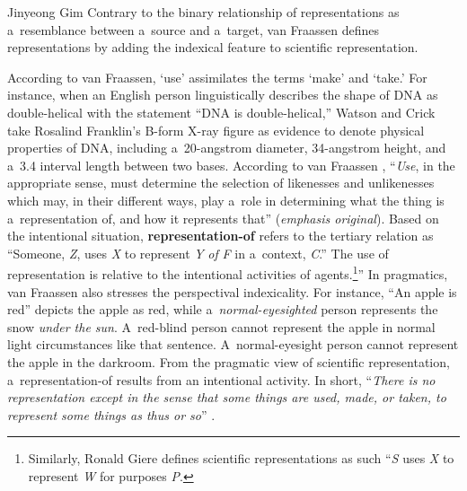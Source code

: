 \begin{artengenv}{Jinyeong Gim}
Contrary to the binary relationship of representations as a~resemblance between a~source and a~target, van Fraassen defines representations by adding the indexical feature to scientific representation.

According to van Fraassen, ‘use' assimilates the terms ‘make' and ‘take.' For instance, when an English person linguistically describes the shape of DNA as double-helical with the statement ``DNA is double-helical,'' Watson and Crick take Rosalind Franklin's B-form X-ray figure as evidence to denote physical properties of DNA, including a~20-angstrom diameter, 34-angstrom height, and a~3.4 interval length between two bases. According to van Fraassen
\parencite*[][p.23]{van_fraassen_scientific_2008}, %
 ``\textit{Use}, in the appropriate sense, must determine the selection of likenesses and unlikenesses which may, in their different ways, play a~role in determining what the thing is a~representation of, and how it represents that'' (\textit{emphasis original}). Based on the intentional situation, \textbf{representation-of} refers to the tertiary relation as ``Someone, \textit{Z}, uses \textit{X} to represent \textit{Y} \textit{of} \textit{F} in a~context, \textit{C}.'' The use of representation is relative to the intentional activities of agents.\footnote{Similarly, Ronald Giere 
\parencite*[][p.60]{giere_scientific_2006} %
 defines scientific representations as such ``\textit{S} uses \textit{X} to represent \textit{W} for purposes \textit{P}.}'' In pragmatics, van Fraassen also stresses the perspectival indexicality. For instance, ``An apple is red'' depicts the apple as red, while a~\textit{normal-eyesighted} person represents the snow \textit{under the sun}. A~red-blind person cannot represent the apple in normal light circumstances like that sentence. A~normal-eyesight person cannot represent the apple in the darkroom. From the pragmatic view of scientific representation, a~representation-of results from an intentional activity. In short, ``\textit{There is no representation except in the sense that some things are used, made, or taken, to represent some things as thus or so}'' 
\parencite[][emphases original]{van_fraassen_scientific_2008}.%



\end{artengenv}
